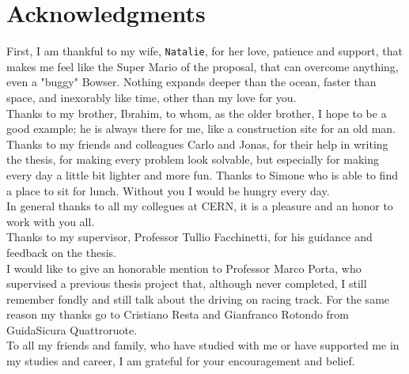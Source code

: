 \chapter*{Acknowledgments}

First, I am thankful to my wife, \texttt{Natalie}, for her love, patience and support, that makes me feel like the Super Mario of the proposal, that can overcome anything, even a "buggy" Bowser. Nothing expands deeper than the ocean, faster than space, and inexorably like time, other than my love for you.\\
Thanks to my brother, Ibrahim, to whom, as the older brother, I hope to be a good example; he is always there for me, like a construction site for an old man.
Thanks to my friends and colleagues Carlo and Jonas, for their help in writing the thesis, for making every problem look solvable, but especially for making every day a little bit lighter and more fun. 
Thanks to Simone who is able to find a place to sit for lunch. Without you I would be hungry every day.\\
In general thanks to all my collegues at CERN, it is a pleasure and an honor to work with you all.\\
Thanks to my supervisor, Professor Tullio Facchinetti, for his guidance and feedback on the thesis.\\
I would like to give an honorable mention to Professor Marco Porta, who supervised a previous thesis project that, although never completed, I still remember fondly and still talk about the driving on racing track. For the same reason my thanks go to Cristiano Resta and Gianfranco Rotondo from GuidaSicura Quattroruote.\\
To all my friends and family, who have studied with me or have supported me in my studies and career, I am grateful for your encouragement and belief.\\

\thispagestyle{empty}
\mbox{}
\newpage
